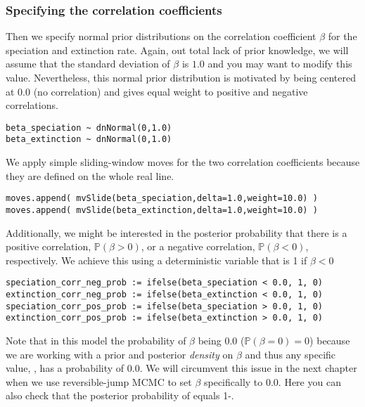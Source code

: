 \subsubsection{Specifying the correlation coefficients}
Then we specify normal prior distributions on the correlation coefficient $\beta$ for the speciation and extinction rate.
Again, out total lack of prior knowledge, we will assume that the standard deviation of $\beta$ is $1.0$ and you may want to modify this value.
Nevertheless, this normal prior distribution is motivated by being centered at 0.0 (no correlation) and gives equal weight to positive and negative correlations.
{\tt \begin{snugshade*}
\begin{lstlisting}
beta_speciation ~ dnNormal(0,1.0)
beta_extinction ~ dnNormal(0,1.0)
\end{lstlisting}
\end{snugshade*}}
We apply simple sliding-window moves for the two correlation coefficients because they are defined on the whole real line.
{\tt \begin{snugshade*}
\begin{lstlisting}
moves.append( mvSlide(beta_speciation,delta=1.0,weight=10.0) )
moves.append( mvSlide(beta_extinction,delta=1.0,weight=10.0) )
\end{lstlisting}
\end{snugshade*}}
Additionally, we might be interested in the posterior probability that there is a positive correlation, $\mathbb{P}(\beta>0)$, or a negative correlation, $\mathbb{P}(\beta<0)$, respectively.
We achieve this using a deterministic variable that is 1 if $\beta<0$
{\tt \begin{snugshade*}
\begin{lstlisting}
speciation_corr_neg_prob := ifelse(beta_speciation < 0.0, 1, 0)
extinction_corr_neg_prob := ifelse(beta_extinction < 0.0, 1, 0)
speciation_corr_pos_prob := ifelse(beta_speciation > 0.0, 1, 0)
extinction_corr_pos_prob := ifelse(beta_extinction > 0.0, 1, 0)
\end{lstlisting}
\end{snugshade*}}
Note that in this model the probability of $\beta$ being 0.0 ($\mathbb{P}(\beta=0)=0$) because we are working with a prior and posterior \emph{density} on $\beta$ and thus any specific value, , has a probability of 0.0.
We will circumvent this issue in the next chapter when we use reversible-jump MCMC to set $\beta$ specifically to 0.0.
Here you can also check that the posterior probability of  equals 1-.

